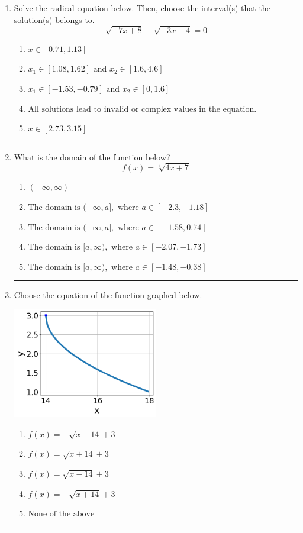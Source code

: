\documentclass[14pt]{extbook}
\newcommand{\litem}[1]{\item#1\hspace*{-1cm}\rule{\textwidth}{0.4pt}}
\begin{document}
\begin{enumerate}
{\begin{enumerate}[label=\Alph*.]
\end{enumerate} }
\litem{
Solve the radical equation below. Then, choose the interval(s) that the solution(s) belongs to.\[ \sqrt{-7 x + 8} - \sqrt{-3 x - 4} = 0 \]\begin{enumerate}[label=\Alph*.]
\item \( x \in [0.71,1.13] \)
\item \( x_1 \in [1.08, 1.62] \text{ and } x_2 \in [1.6,4.6] \)
\item \( x_1 \in [-1.53, -0.79] \text{ and } x_2 \in [0,1.6] \)
\item \( \text{All solutions lead to invalid or complex values in the equation.} \)
\item \( x \in [2.73,3.15] \)

\end{enumerate} }
\litem{
What is the domain of the function below?\[ f(x) = \sqrt[3]{4 x + 7} \]\begin{enumerate}[label=\Alph*.]
\item \( (-\infty, \infty) \)
\item \( \text{The domain is } (-\infty, a], \text{   where } a \in [-2.3, -1.18] \)
\item \( \text{The domain is } (-\infty, a], \text{   where } a \in [-1.58, 0.74] \)
\item \( \text{The domain is } [a, \infty), \text{   where } a \in [-2.07, -1.73] \)
\item \( \text{The domain is } [a, \infty), \text{   where } a \in [-1.48, -0.38] \)

\end{enumerate} }
\litem{
Choose the equation of the function graphed below.
\begin{center}
    \includegraphics[width=0.5\textwidth]{../Figures/radicalGraphToEquationCopyC.png}
\end{center}
\begin{enumerate}[label=\Alph*.]
\item \( f(x) = - \sqrt{x - 14} + 3 \)
\item \( f(x) = \sqrt{x + 14} + 3 \)
\item \( f(x) = \sqrt{x - 14} + 3 \)
\item \( f(x) = - \sqrt{x + 14} + 3 \)
\item \( \text{None of the above} \)


\end{enumerate}}
\end{enumerate}
\end{document}
